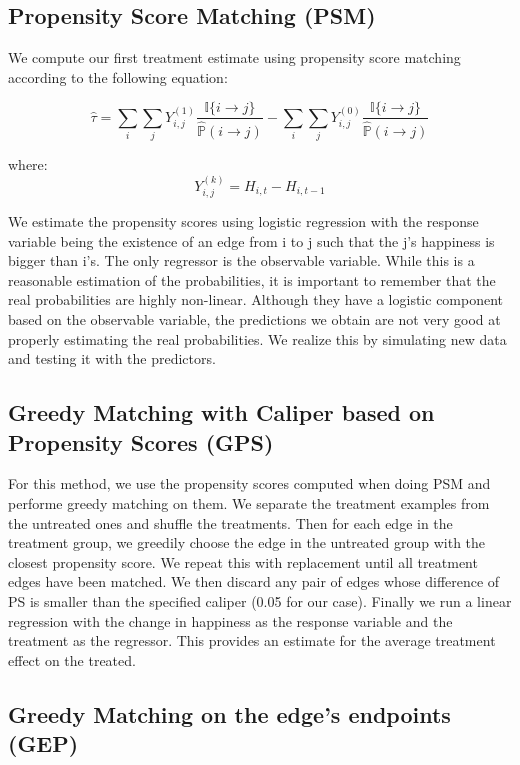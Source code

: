 \documentclass[11pt]{article}
\begin{document}
\subsection{Propensity Score Matching (PSM)}

We compute our first treatment estimate using propensity score matching according to the following equation:

$$\hat{\tau} = \sum\limits_i\sum\limits_j Y_{i,j}^{(1)}\frac{\mathbb{I}\{i \rightarrow j\}}{\hat{\mathbb{P}}(i\rightarrow j)} - \sum\limits_i\sum\limits_j Y_{i,j}^{(0)}\frac{\mathbb{I}\{i \rightarrow j\}}{\hat{\mathbb{P}}(i\rightarrow j)}$$

where:
$$Y_{i,j}^{(k)} = H_{i,t}-H_{i,t-1}$$

We estimate the propensity scores using logistic regression with the response variable being the existence of an edge from i to j such that the j's happiness is bigger than i's. The only regressor is the observable variable. While this is a reasonable estimation of the probabilities, it is important to remember that the real probabilities are highly non-linear. Although they have a logistic component based on the observable variable, the predictions we obtain are not very good at properly estimating the real probabilities. We realize this by simulating new data and testing it with the predictors. 

\subsection{Greedy Matching with Caliper based on Propensity Scores (GPS)}
For this method, we use the propensity scores computed when doing PSM and performe greedy matching on them. We separate the treatment examples from the untreated ones and shuffle the treatments. Then for each edge in the treatment group, we greedily choose the edge in the untreated group with the closest propensity score. We repeat this with replacement until all treatment edges have been matched. We then discard any pair of edges whose difference of PS is smaller than the specified caliper (0.05 for our case). Finally we run a linear regression with the change in happiness as the response variable and the treatment as the regressor. This provides an estimate for the average treatment effect on the treated.

\subsection{Greedy Matching on the edge's endpoints (GEP)}
\end{document}
